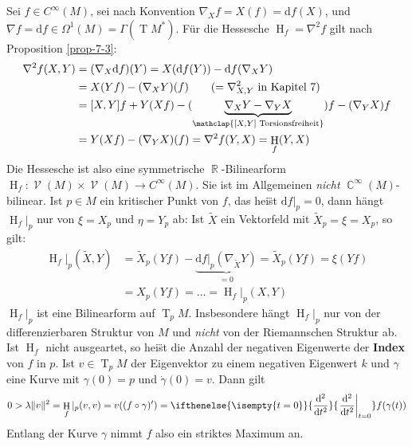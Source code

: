 \documentclass[paper=A4, twoside, chapterprefix=true, bibliography=totoc, headsepline]{scrbook}
\DeclareMathOperator{\C}{\mathbb{C}}
\DeclareMathOperator{\R}{\mathbb{R}}
\DeclareMathOperator{\calV}{\mathcal{V}}
\DeclareMathOperator{\Hh}{H}        %
\DeclareMathOperator{\T}{T}         %
\newcommand{\dop}{\mathrm{d}}
\newcommand{\X}{\times}
\newcommand{\difffrac}[3][]{\ifthenelse{\isempty{#1}}{\frac{\dop #2}{\dop #3}}{\left. \frac{\dop #2}{\dop #3} \right|_{#1}}}
\theoremstyle{plain}
\theoremstyle{nonumberplain}
\theoremstyle{empty}
\theoremstyle{break}
\newcommand{\CmIndex}[2][]{\ifthenelse{\isempty{#1}}{\index{#2}}{\index{#1}}#2}
\newcommand{\CmMark}[2][]{\textbf{\CmIndex[#1]{#2}}}
\begin{document}
Sei $f \in C^\infty(M)$, sei nach Konvention $\nabla_X f = X(f) = \dop f(X)$, und $\nabla f = \dop f \in \Omega^1(M) = \Gamma(\T M^*)$. F\"ur die Hessesche $\Hh_f = \nabla^2 f$ gilt nach Proposition
\ref{prop-7-3}:
\begin{align*}
  \nabla^2 f (X,Y) &= (\nabla_X \dop f)(Y) = X(\dop f(Y)) - \dop f(\nabla_X Y)\\
  &= X(Yf) - (\nabla_X Y)(f) \qquad (= \nabla_{X,Y}^2 \text{ in Kapitel 7})\\
  &= [X,Y]f + Y(Xf) - (\underbrace{\nabla_X Y - \nabla_Y X}_{\mathclap{[X,Y] \text{ Torsionsfreiheit}}}) f - (\nabla_Y X) f\\
  &= Y(Xf) - (\nabla_YX)(f) = \nabla^2 f(Y,X) = \Hh_f(Y,X)
\end{align*}
Die Hessesche ist also eine symmetrische $\R$-Bilinearform $\Hh_f: \calV(M) \X \calV(M) \to C^\infty(M)$.
Sie ist im Allgemeinen \emph{nicht} $\C^\infty(M)$-bilinear.
Ist $p \in M$ ein kritischer Punkt von $f$, das hei\"st $\dop f|_p = 0$, dann h\"angt $\Hh_f|_p$ nur von $\xi = X_p$ und $\eta = Y_p$ ab:
Ist $\tilde X$ ein Vektorfeld mit $\tilde X_p = \xi = X_p$, so gilt:
\begin{align*}
  \Hh_f|_p(\tilde X,Y) &= \tilde X_p(Yf) - \underbrace{\dop f|_p(\nabla_{\tilde X}Y)}_{=0} = \tilde X_p(Yf) = \xi(Yf)\\
  &= X_p(Yf) = \ldots = \Hh_f|_p(X,Y)
\end{align*}
$\Hh_f|_p$ ist eine Bilinearform auf $\T_pM$. Insbesondere h\"angt $\Hh_f|_p$ nur von der differenzierbaren Struktur von $M$ und \emph{nicht} von der Riemannschen Struktur ab.
Ist $\Hh_f$ nicht ausgeartet, so hei\"st die Anzahl der negativen Eigenwerte der \CmMark{Index} von $f$ in $p$.
Ist $v \in \T_pM$ der Eigenvektor zu einem negativen Eigenwert $k$ und $\gamma$ eine Kurve mit
$\gamma(0)=p$ und $\dot\gamma(0)=v$.
Dann gilt
\begin{align*}
  0 > \lambda \| v \|^2 = \Hh_f|_p (v,v) = v((f \circ \gamma)') =
  \difffrac[t=0]{^2}{t^2} f(\gamma(t))
\end{align*}
Entlang der Kurve $\gamma$ nimmt $f$ also ein striktes Maximum an.
\end{document}
